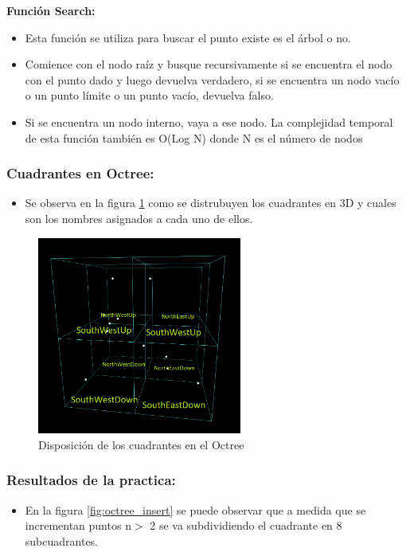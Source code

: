 \documentclass{article}
\begin{document}
\textbf{Función Search:}
\begin{itemize}
\item Esta función se utiliza para buscar el punto existe es el árbol o no.
\item Comience con el nodo raíz y busque recursivamente si se encuentra el nodo con el punto dado y luego devuelva verdadero, si se encuentra un nodo vacío o un punto límite o un punto vacío, devuelva falso.
\item Si se encuentra un nodo interno, vaya a ese nodo. La complejidad temporal de esta función también es O(Log N) donde N es el número de nodos
\end{itemize}

\subsubsection{Cuadrantes en Octree: }
\begin{itemize}
    \item Se observa en la figura \ref{fig:octree_cuadrante} como se distrubuyen los cuadrantes en 3D y cuales son los nombres asignados a cada uno de ellos.
\end{itemize}
\begin{figure}[h!]
\centering
\includegraphics[width=0.6\textwidth]{img/octree_cuadrante.png}
\caption{Disposición de los cuadrantes en el Octree}
\label{fig:octree_cuadrante}
\end{figure}
\clearpage
\subsubsection{Resultados de la practica: }

\begin{itemize}
\item En la figura \ref{fig:octree_insert} se puede observar que a medida que se incrementan puntos n$>$ 2 se va subdividiendo el cuadrante en 8 subcuadrantes.
\end{itemize}
\end{document}
